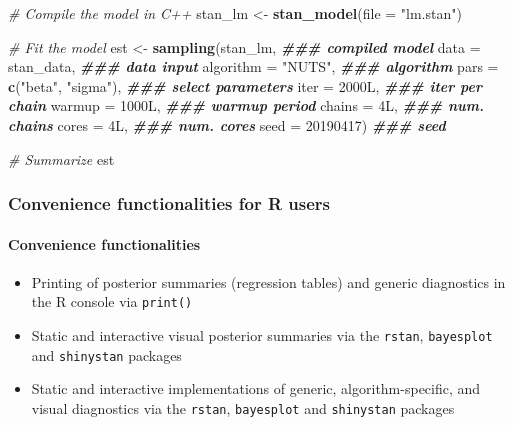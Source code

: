 \documentclass[
  11pt,
]{article}
\newenvironment{Shaded}{\begin{snugshade}}{\end{snugshade}}
\newcommand{\AttributeTok}[1]{\textcolor[rgb]{0.13,0.29,0.53}{#1}}
\newcommand{\CommentTok}[1]{\textcolor[rgb]{0.56,0.35,0.01}{\textit{#1}}}
\newcommand{\DecValTok}[1]{\textcolor[rgb]{0.00,0.00,0.81}{#1}}
\newcommand{\DocumentationTok}[1]{\textcolor[rgb]{0.56,0.35,0.01}{\textbf{\textit{#1}}}}
\newcommand{\FunctionTok}[1]{\textcolor[rgb]{0.13,0.29,0.53}{\textbf{#1}}}
\newcommand{\NormalTok}[1]{#1}
\newcommand{\OtherTok}[1]{\textcolor[rgb]{0.56,0.35,0.01}{#1}}
\newcommand{\StringTok}[1]{\textcolor[rgb]{0.31,0.60,0.02}{#1}}
\providecommand{\tightlist}{%
  \setlength{\itemsep}{0pt}\setlength{\parskip}{0pt}}
\begin{document}
\begin{Shaded}
\begin{Highlighting}[]
\CommentTok{\# Compile the model in C++}
\NormalTok{stan\_lm }\OtherTok{\textless{}{-}} \FunctionTok{stan\_model}\NormalTok{(}\AttributeTok{file =} \StringTok{"lm.stan"}\NormalTok{)}

\CommentTok{\# Fit the model}
\NormalTok{est }\OtherTok{\textless{}{-}} \FunctionTok{sampling}\NormalTok{(stan\_lm,                           }\DocumentationTok{\#\#\# compiled model}
                \AttributeTok{data =}\NormalTok{ stan\_data,                  }\DocumentationTok{\#\#\# data input}
                \AttributeTok{algorithm =} \StringTok{"NUTS"}\NormalTok{,                }\DocumentationTok{\#\#\# algorithm}
                \AttributeTok{pars =} \FunctionTok{c}\NormalTok{(}\StringTok{"beta"}\NormalTok{, }\StringTok{"sigma"}\NormalTok{),         }\DocumentationTok{\#\#\# select parameters}
                \AttributeTok{iter =}\NormalTok{ 2000L,                      }\DocumentationTok{\#\#\# iter per chain}
                \AttributeTok{warmup =}\NormalTok{ 1000L,                    }\DocumentationTok{\#\#\# warmup period}
                \AttributeTok{chains =}\NormalTok{ 4L,                       }\DocumentationTok{\#\#\# num. chains}
                \AttributeTok{cores =}\NormalTok{ 4L,                        }\DocumentationTok{\#\#\# num. cores}
                \AttributeTok{seed =} \DecValTok{20190417}\NormalTok{)                   }\DocumentationTok{\#\#\# seed}

\CommentTok{\# Summarize}
\NormalTok{est}
\end{Highlighting}
\end{Shaded}

\hypertarget{convenience-functionalities-for-r-users-1}{%
\subsubsection{Convenience functionalities for R users}\label{convenience-functionalities-for-r-users-1}}

\hypertarget{convenience-functionalities-1}{%
\paragraph{Convenience functionalities}\label{convenience-functionalities-1}}

\begin{itemize}
\tightlist
\item
  Printing of posterior summaries (regression tables) and generic diagnostics in the R console via \texttt{print()}
\item
  Static and interactive visual posterior summaries via the \texttt{rstan}, \texttt{bayesplot} and \texttt{shinystan} packages
\item
  Static and interactive implementations of generic, algorithm-specific, and visual diagnostics via the \texttt{rstan}, \texttt{bayesplot} and \texttt{shinystan} packages
\end{itemize}
\end{document}
